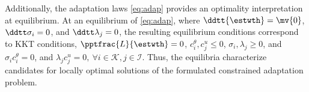 \documentclass[letterpaper, journal]{IEEEtran}
\begin{document}
Additionally, the adaptation laws \eqref{eq:adap} provides an optimality interpretation at equilibrium.
At an equilibrium of \eqref{eq:adap}, where $\ddtt{\estwth}=\mv{0}$, $\ddtt\sigma_i=0$, and $\ddtt\lambda_j=0$, the resulting equilibrium conditions correspond to KKT conditions, \ie $\pptfrac{L}{\estwth}=0$, $c^{\theta}_i,c^{u}_j \le 0$, $\sigma_i,\lambda_j \ge 0$, and $\sigma_i c^{\theta}_i=0$, and $\lambda_j c^{u}_j=0,\ \forall i\in\mathcal{K},j\in\mathcal{I}$.
Thus, the equilibria characterize candidates for locally optimal solutions of the formulated constrained adaptation problem.



\end{document}
